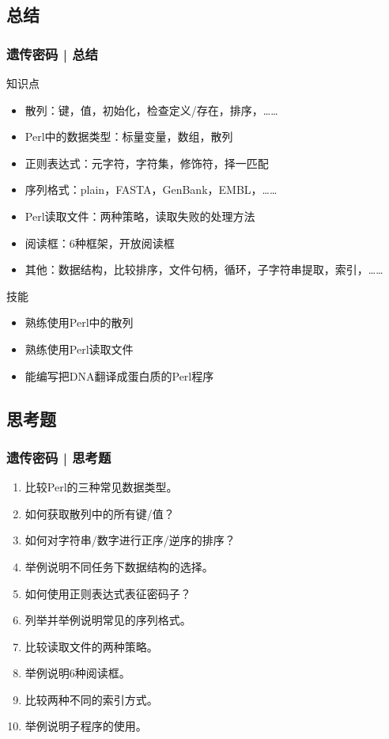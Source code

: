 \subsection{总结}
\begin{frame}
  \frametitle{遗传密码 | 总结}
  \begin{block}{知识点}
    \begin{itemize}
      \item 散列：键，值，初始化，检查定义/存在，排序，……
      \item Perl中的数据类型：标量变量，数组，散列
      \item 正则表达式：元字符，字符集，修饰符，择一匹配
      \item 序列格式：plain，FASTA，GenBank，EMBL，……
      \item Perl读取文件：两种策略，读取失败的处理方法
      \item 阅读框：6种框架，开放阅读框
      \item 其他：数据结构，比较排序，文件句柄，循环，子字符串提取，索引，……
    \end{itemize}
  \end{block}
  \pause
  \begin{block}{技能}
    \begin{itemize}
      \item 熟练使用Perl中的散列
      \item 熟练使用Perl读取文件
      \item 能编写把DNA翻译成蛋白质的Perl程序
    \end{itemize}
  \end{block}
\end{frame}

\subsection{思考题}
\begin{frame}
  \frametitle{遗传密码 | 思考题}
  \begin{enumerate}
    \item 比较Perl的三种常见数据类型。
    \item 如何获取散列中的所有键/值？
    \item 如何对字符串/数字进行正序/逆序的排序？
    \item 举例说明不同任务下数据结构的选择。
    \item 如何使用正则表达式表征密码子？
    \item 列举并举例说明常见的序列格式。
    \item 比较读取文件的两种策略。
    \item 举例说明6种阅读框。
    \item 比较两种不同的索引方式。
    \item 举例说明子程序的使用。
  \end{enumerate}
\end{frame}

